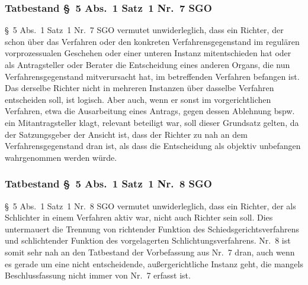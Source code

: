 \subsubsection{Tatbestand \S~5 Abs.~1 Satz~1 Nr.~7 SGO}
\label{Zusammensetzung:Spruchkoerper:Befangenheitsvermutung:Nr7}
\S~5 Abs.~1 Satz~1 Nr.~7 SGO vermutet unwiderleglich, dass ein Richter, der  schon über das Verfahren oder den konkreten Verfahrensgegenstand im regulären vorprozessualen Geschehen oder einer unteren Instanz mitentschieden hat oder als Antragsteller oder Berater die Entscheidung eines anderen Organs, die nun Verfahrensgegenstand mitverursacht hat, im betreffenden Verfahren befangen ist.
Das derselbe Richter nicht in mehreren Instanzen über dasselbe Verfahren entscheiden soll, ist logisch.
Aber auch, wenn er sonst im vorgerichtlichen Verfahren, etwa die Ausarbeitung eines Antrags, gegen dessen Ablehnung bspw. ein Mitantragsteller klagt, relevant beteiligt war, soll dieser Grundsatz gelten, da der Satzungsgeber der Ansicht ist, dass der Richter zu nah an dem Verfahrensgegenstand dran ist, als dass die Entscheidung als objektiv unbefangen wahrgenommen werden würde.

\subsubsection{Tatbestand \S~5 Abs.~1 Satz~1 Nr.~8 SGO}
\label{Zusammensetzung:Spruchkoerper:Befangenheitsvermutung:Nr8}
\S~5 Abs.~1 Satz~1 Nr.~8 SGO vermutet unwiderleglich, dass ein Richter, der als Schlichter in einem Verfahren aktiv war, nicht auch Richter sein soll.
Dies untermauert die Trennung von richtender Funktion des Schiedsgerichtsverfahrens und schlichtender Funktion des vorgelagerten Schlichtungsverfahrens.
Nr.~8 ist somit sehr nah an den Tatbestand der Vorbefassung aus Nr.~7 dran, auch wenn es gerade um eine nicht entscheidende, außergerichtliche Instanz geht, die mangels Beschlussfassung nicht immer von Nr.~7 erfasst ist.



\chapterbib
